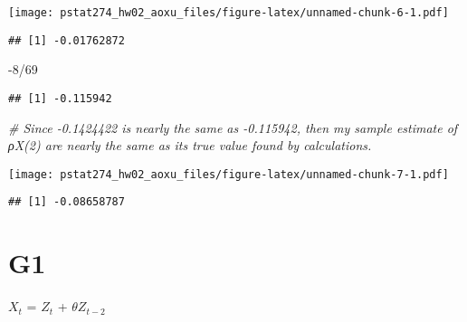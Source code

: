 \documentclass[
]{article}
\newenvironment{Shaded}{\begin{snugshade}}{\end{snugshade}}
\newcommand{\AttributeTok}[1]{\textcolor[rgb]{0.77,0.63,0.00}{#1}}
\newcommand{\CommentTok}[1]{\textcolor[rgb]{0.56,0.35,0.01}{\textit{#1}}}
\newcommand{\DecValTok}[1]{\textcolor[rgb]{0.00,0.00,0.81}{#1}}
\newcommand{\FunctionTok}[1]{\textcolor[rgb]{0.00,0.00,0.00}{#1}}
\newcommand{\NormalTok}[1]{#1}
\newcommand{\OtherTok}[1]{\textcolor[rgb]{0.56,0.35,0.01}{#1}}
\newcommand{\SpecialCharTok}[1]{\textcolor[rgb]{0.00,0.00,0.00}{#1}}
\newcommand{\StringTok}[1]{\textcolor[rgb]{0.31,0.60,0.02}{#1}}
\begin{document}
\texttt{[image: pstat274\_hw02\_aoxu\_files/figure-latex/unnamed-chunk-6-1.pdf]}

\begin{verbatim}
## [1] -0.01762872
\end{verbatim}

\begin{Shaded}
\begin{Highlighting}[]
\SpecialCharTok{{-}}\DecValTok{8}\SpecialCharTok{/}\DecValTok{69}
\end{Highlighting}
\end{Shaded}

\begin{verbatim}
## [1] -0.115942
\end{verbatim}

\begin{Shaded}
\begin{Highlighting}[]
\CommentTok{\# Since {-}0.1424422 is nearly the same as {-}0.115942, then my sample estimate of ρX(2) are nearly the same as its true value found by calculations.}
\end{Highlighting}
\end{Shaded}

\begin{Shaded}
\end{Shaded}

\texttt{[image: pstat274\_hw02\_aoxu\_files/figure-latex/unnamed-chunk-7-1.pdf]}

\begin{verbatim}
## [1] -0.08658787
\end{verbatim}

\hypertarget{g1}{%
\section{G1}\label{g1}}

\(X_t\) = \(Z_t\) + \(\theta\)\(Z_{t-2}\)
\end{document}

